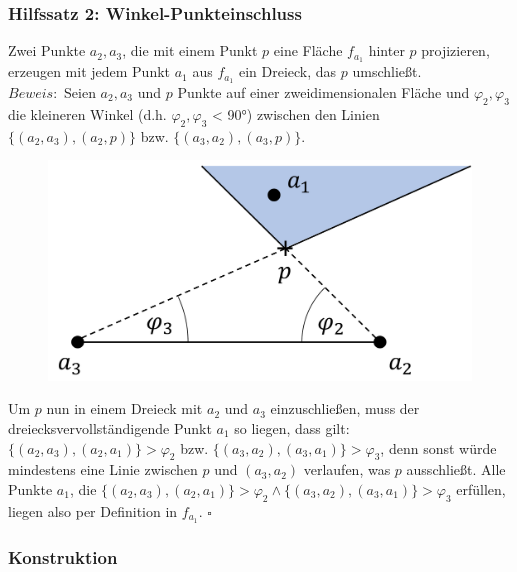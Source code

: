 \documentclass[a4paper]{extarticle}
\begin{document}
    \subsubsection{Hilfssatz 2: Winkel-Punkteinschluss}
    Zwei Punkte $a_2, a_3$, die mit einem Punkt $p$ eine Fläche $f_{a_1}$ hinter $p$ projizieren, erzeugen
    mit jedem Punkt $a_1$ aus $f_{a_1}$ ein Dreieck, das $p$ umschließt. \\
    $Beweis:$ Seien $a_2, a_3$ und $p$ Punkte auf einer zweidimensionalen Fläche und $\varphi_2, 
    \varphi_3$ die kleineren Winkel (d.h. $\varphi_2, \varphi_3$ < 90°) zwischen den Linien 
    $ \{ (a_2,a_3),(a_2,p) \} $ bzw. $ \{ (a_3,a_2),(a_3,p) \} $.
    
    \begin{figure}[!ht]
        \centering	
        \includegraphics[scale=0.15]{bilder/tri_hilfssatz.pdf}
        \label{fig:triangulation_hilfssatz_1}
    \end{figure}

    Um $p$ nun in einem Dreieck mit $a_2$ und $a_3$ einzuschließen, muss der dreiecksvervollständigende
    Punkt $a_1$ so liegen, dass gilt:
    $ \{ (a_2,a_3),(a_2,a_1) \} > \varphi_2 $ bzw. $ \{ (a_3,a_2),(a_3,a_1) \} > \varphi_3 $, denn 
    sonst würde mindestens eine Linie zwischen $p$ und $(a_3,a_2)$ verlaufen, was $p$ ausschließt.
    Alle Punkte $a_1$, die $ \{ (a_2,a_3),(a_2,a_1) \} > \varphi_2 \land \{ (a_3,a_2),(a_3,a_1) \} > \varphi_3 $ 
    erfüllen, liegen also per Definition in $f_{a_1}$. $\square$

    \subsubsection{Konstruktion}
\end{document}
